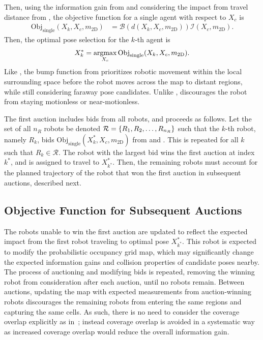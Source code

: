 Then, using the information gain from  and considering the impact from travel distance from , the objective function for a single agent with respect to $X_{c}$ is
\begin{align}
\label{eqn:CandidateBidSingle}
\text{Obj}_\text{single}(X_k,X_c,m_\text{2D})&=\mathcal B(d(X_k,X_c,m_\text{2D}))\mathcal I(X_{c},m_\text{2D}).
\end{align}
Then, the optimal pose selection for the $k$-th agent is
\begin{align}
\label{eqn:OptPoseSingle}
X^*_{k}=\argmax_{X_c}\text{Obj}_\text{single}(X_k,X_c,m_\text{2D}).
\end{align}
Like , the bump function from  prioritizes robotic movement within the local surrounding space before the robot moves across the map to distant regions, while still considering faraway pose candidates. Unlike ,  discourages the robot from staying motionless or near-motionless.

The first auction includes bids from all robots, and proceeds as follows. Let the set of all $n_R$ robots be denoted $\mathcal R=\left\{ R_1,R_2,\dots,R_{n_R} \right\}$ such that the $k$-th robot, namely $R_k$, bids $\text{Obj}_\text{single}(X^*_k,X_c,m_\text{2D})$ from  and . This is repeated for all $k$ such that $R_k\in\mathcal R$. The robot with the largest bid wins the first auction at index $k^*$, and is assigned to travel to $X^*_{k^*}$. Then, the remaining robots must account for the planned trajectory of the robot that won the first auction in subsequent auctions, described next.



\subsection{Objective Function for Subsequent Auctions}

The robots unable to win the first auction are updated to reflect the expected impact from the first robot traveling to optimal pose $X^*_{k^*}$.
This robot is expected to modify the probabilistic occupancy grid map, which may significantly change the expected information gains and collision properties of candidate poses nearby. The process of auctioning and modifying bids is repeated, removing the winning robot from consideration after each auction, until no robots remain. Between auctions, updating the map with expected measurements from auction-winning robots discourages the remaining robots from entering the same regions and capturing the same cells. As such, there is no need to consider the coverage overlap explicitly as in~\cite{SimApfBurFoxMooThrYou00}; instead coverage overlap is avoided in a systematic way as increased coverage overlap would reduce the overall information gain.

